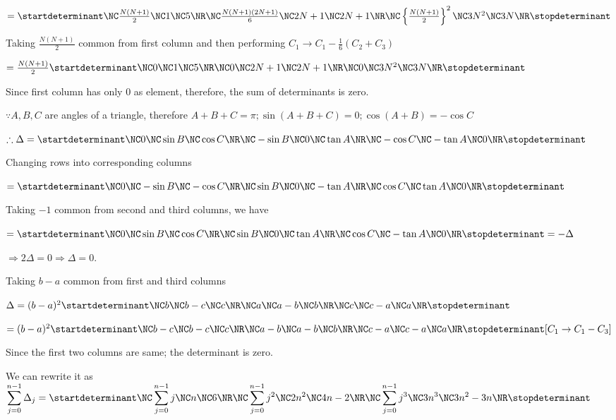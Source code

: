   $= \startdeterminant\NC\frac{N(N + 1)}{2} \NC 1 \NC 5 \NR\NC \frac{N(N + 1)(2N +
    1)}{6} \NC 2N + 1 \NC 2N + 1 \NR\NC \left\{\frac{N(N + 1)}{2}\right\}^2 \NC 3N^2 \NC
  3N\NR\stopdeterminant$

  Taking $\frac{N(N + 1)}{2}$ common from first column and then
  performing $C_1\rightarrow C_1 - \frac{1}{6}(C_2 + C_3)$

  $= \frac{N(N + 1)}{2}\startdeterminant\NC0 \NC 1 \NC 5 \NR\NC 0 \NC 2N + 1 \NC 2N + 1
  \NR\NC 0 \NC 3N^2 \NC 3N\NR\stopdeterminant$

  Since first column has only $0$ as element, therefore, the sum of determinants
  is zero.
\item $\because A, B, C$ are angles of a triangle, therefore $A +
  B + C = \pi; \sin(A + B + C) = 0; \cos(A + B) = -\cos C$

  $\therefore \Delta = \startdeterminant\NC0 \NC \sin B \NC \cos C \NR\NC -\sin B
  \NC 0 \NC \tan A \NR\NC -\cos C \NC -\tan A \NC 0 \NR\stopdeterminant$

  Changing rows into corresponding columns

  $= \startdeterminant\NC0 \NC -\sin B \NC -\cos C \NR\NC \sin B \NC 0 \NC -\tan A \NR\NC
  \cos C \NC \tan A \NC 0\NR\stopdeterminant$

  Taking $-1$ common from second and third columns, we have

  $= \startdeterminant\NC0 \NC \sin B \NC \cos C \NR\NC \sin B \NC 0 \NC \tan A \NR\NC
  \cos C \NC -\tan A \NC 0\NR\stopdeterminant = -\Delta$

  $\Rightarrow 2\Delta = 0 \Rightarrow \Delta = 0$.
\item Taking $b - a$ common from first and third columns

  $\Delta = (b - a)^2 \startdeterminant\NC b \NC b - c \NC c \NR\NC a \NC a - b \NC b \NR\NC
  c \NC c - a \NC a\NR\stopdeterminant$

  $= (b - a)^2 \startdeterminant\NC b - c \NC b - c \NC c \NR\NC a - b \NC a - b \NC b
  \NR\NC c - a \NC c - a \NC a\NR\stopdeterminant[C_1 \rightarrow C_1 - C_3]$

  Since the first two columns are same; the determinant is zero.
\item We can rewrite it as $\displaystyle\sum_{j = 0}^{n - 1}\Delta_j =
  \startdeterminant\NC\displaystyle\sum_{j = 0}^{n - 1} j \NC n \NC 6 \NR\NC \displaystyle\sum_{j = 0}^{n - 1} j^2
  \NC 2n^2 \NC 4n - 2 \NR\NC \displaystyle\sum_{j = 0}^{n - 1}j^3 \NC 3n^3 \NC 3n^2 - 3n\NR\stopdeterminant$

